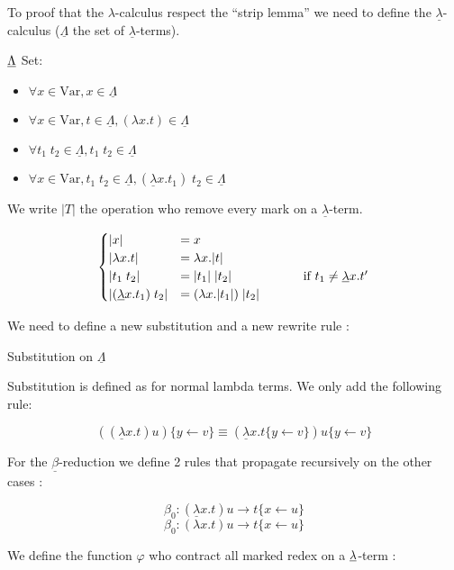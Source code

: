  \newpage
  To proof that the $\lambda$-calculus respect the ``strip lemma'' we need to
  define the $\underline{\lambda}$-calculus ($\underline{\Lambda}$ the set of
  $\underline{\lambda}$-terms).

   ${\underline \Lambda}$ Set:

  \begin{itemize}
    \item $\forall x \in \text{Var}, x \in \underline{\Lambda}$
    \item $\forall x \in \text{Var}, t \in \underline{\Lambda}, (\lambda x. t) \in \underline{\Lambda}$
    \item $\forall t_1\;t_2 \in \underline{\Lambda}, t_1\;t_2
      \in \underline{\Lambda}$
    \item $\forall x \in \text{Var}, t_1\;t_2 \in \underline{\Lambda},
      (\underline{\lambda} x. t_1)\; t_2 \in \underline{\Lambda}$
  \end{itemize}

  We write $|T|$ the operation who remove every mark on a $\underline
  \lambda$-term.

  \[
    \begin{cases}
      |x| &= x \\
      |\lambda x. t| &= \lambda x. |t| \\
      |t_1\;t_2|     &= |t_1|\; |t_2| \text{\hspace{2cm}if } t_1 \not = \underline \lambda x. t'\\
      |(\underline \lambda x. t_1) \; t_2| &= (\lambda x. |t_1|)\; |t_2|
    \end{cases}
  \]

  We need to define a new substitution and a new rewrite rule :

   Substitution on $\underline \Lambda$

  Substitution is defined as for normal lambda terms. We only add the
  following rule:

  $$((\underline{\lambda}x.t)u)\{y \leftarrow v\} \equiv
  (\underline{\lambda}x.t\{y \leftarrow v\})u\{y \leftarrow v\} $$

   For the $\underline \beta$-reduction we define 2 rules that propagate
  recursively on the other cases :

  $$\beta_0: (\underline \lambda x. t) u \to t\{x \leftarrow u\}$$
  $$\beta_0: (\lambda x. t) u \to t\{x \leftarrow u\}$$


   We define the function $\varphi$ who contract all marked redex on a
  ${\underline \lambda}$-term :

